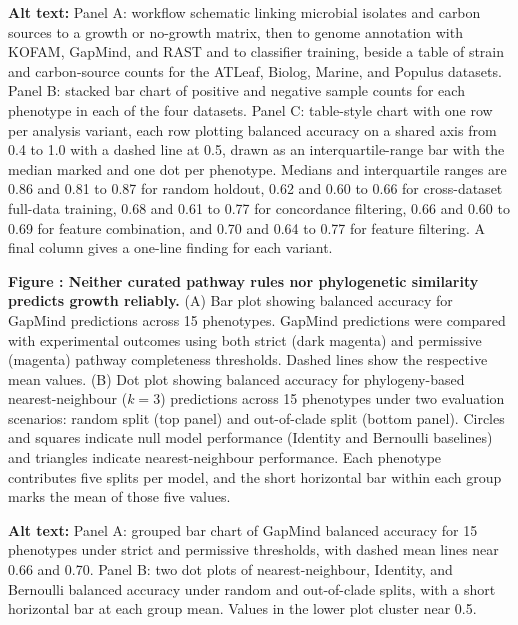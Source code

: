 \noindent\textbf{Alt text:} Panel A: workflow schematic linking microbial isolates and carbon sources to a growth or no-growth matrix, then to genome annotation with KOFAM, GapMind, and RAST and to classifier training, beside a table of strain and carbon-source counts for the ATLeaf, Biolog, Marine, and Populus datasets. Panel B: stacked bar chart of positive and negative sample counts for each phenotype in each of the four datasets. Panel C: table-style chart with one row per analysis variant, each row plotting balanced accuracy on a shared axis from 0.4 to 1.0 with a dashed line at 0.5, drawn as an interquartile-range bar with the median marked and one dot per phenotype. Medians and interquartile ranges are 0.86 and 0.81 to 0.87 for random holdout, 0.62 and 0.60 to 0.66 for cross-dataset full-data training, 0.68 and 0.61 to 0.77 for concordance filtering, 0.66 and 0.60 to 0.69 for feature combination, and 0.70 and 0.64 to 0.77 for feature filtering. A final column gives a one-line finding for each variant.
\par\medskip

\label{fig:baseline_predictions}%
\noindent\textbf{Figure : Neither curated pathway rules nor phylogenetic similarity predicts growth reliably.}
(A) Bar plot showing balanced accuracy for GapMind predictions across 15 phenotypes.
GapMind predictions were compared with experimental outcomes using both strict (dark magenta) and permissive (magenta) pathway completeness thresholds.
Dashed lines show the respective mean values.
(B) Dot plot showing balanced accuracy for phylogeny-based nearest-neighbour ($k=3$) predictions across 15 phenotypes under two evaluation scenarios: random split (top panel) and out-of-clade split (bottom panel).
Circles and squares indicate null model performance (Identity and Bernoulli baselines) and triangles indicate nearest-neighbour performance.
Each phenotype contributes five splits per model, and the short horizontal bar within each group marks the mean of those five values.

\noindent\textbf{Alt text:} Panel A: grouped bar chart of GapMind balanced accuracy for 15 phenotypes under strict and permissive thresholds, with dashed mean lines near 0.66 and 0.70. Panel B: two dot plots of nearest-neighbour, Identity, and Bernoulli balanced accuracy under random and out-of-clade splits, with a short horizontal bar at each group mean. Values in the lower plot cluster near 0.5.
\par\medskip

